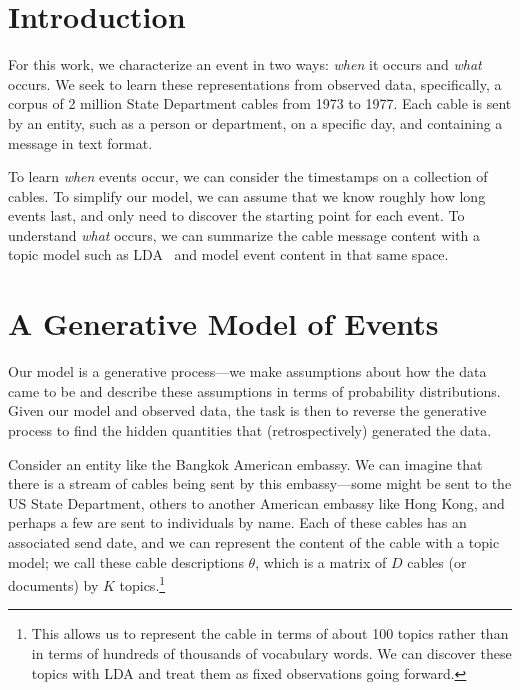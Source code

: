 \section{Introduction}
%



For this work, we characterize an event in two ways: \emph{when} it occurs and \emph{what} occurs.  We seek to learn these representations from observed data, specifically, a corpus of 2 million State Department cables from 1973 to 1977.  Each cable is sent by an entity, such as a person or department, on a specific day, and containing a message in text format.



To learn \emph{when} events occur, we can consider the timestamps on a collection of cables.  To simplify our model, we can assume that we know roughly how long events last, and only need to discover the starting point for each event.  To understand \emph{what} occurs, we can summarize the cable message content with a topic model such as LDA~\citep{Blei:2003} and model event content in that same space.

\section{A Generative Model of Events}
Our model is a generative process---we make assumptions about how the data came to be and describe these assumptions in terms of probability distributions.  Given our model and observed data, the task is then to reverse the generative process to find the hidden quantities that (retrospectively) generated the data.

Consider an entity like the Bangkok American embassy.  We can imagine that there is a stream of cables being sent by this embassy---some might be sent to the US State Department, others to another American embassy like Hong Kong, and perhaps a few are sent to individuals by name.  Each of these cables has an associated send date, and we can represent the content of the cable with a topic model; we call these cable descriptions $\theta$, which is a matrix of $D$ cables (or documents) by $K$ topics.\footnote{This allows us to represent the cable in terms of about 100 topics rather than in terms of hundreds of thousands of vocabulary words. We can discover these topics with LDA and treat them as fixed observations going forward.}

